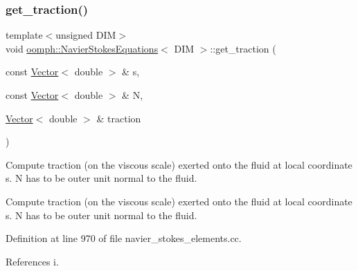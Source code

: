 \subsubsection{\texorpdfstring{get\+\_\+traction()}{get\_traction()}\hspace{0.1cm}{\footnotesize\ttfamily [1/2]}}
{\footnotesize\ttfamily template$<$unsigned D\+IM$>$ \\
void \hyperlink{classoomph_1_1NavierStokesEquations}{oomph\+::\+Navier\+Stokes\+Equations}$<$ D\+IM $>$\+::get\+\_\+traction (\begin{DoxyParamCaption}\item[{const \hyperlink{classoomph_1_1Vector}{Vector}$<$ double $>$ \&}]{s,  }\item[{const \hyperlink{classoomph_1_1Vector}{Vector}$<$ double $>$ \&}]{N,  }\item[{\hyperlink{classoomph_1_1Vector}{Vector}$<$ double $>$ \&}]{traction }\end{DoxyParamCaption})}



Compute traction (on the viscous scale) exerted onto the fluid at local coordinate s. N has to be outer unit normal to the fluid. 

Compute traction (on the viscous scale) exerted onto the fluid at local coordinate s. N has to be outer unit normal to the fluid. 

Definition at line 970 of file navier\+\_\+stokes\+\_\+elements.\+cc.



References i.

\mbox{\label{classoomph_1_1NavierStokesEquations_a1be4be78ea52f3bf5814dd4d13f766cf}} 
